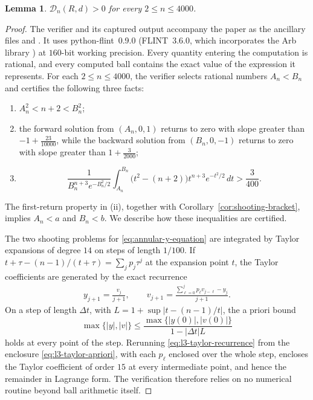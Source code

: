 \documentclass[11pt]{article}
\numberwithin{equation}{section}
\newtheorem{lemma}[theorem]{Lemma}
\theoremstyle{definition}
\begin{document}
\begin{lemma}\label{lem:l3-finite}
$\mathcal D_n(R,d)>0$ for every $2\leq n\leq4000$.
\end{lemma}

\begin{proof}
The verifier and its captured output accompany the paper as the ancillary
files  and
. It uses python-flint~0.9.0
(FLINT~3.6.0, which incorporates the Arb library \cite{arb}) at $160$-bit
working precision. Every quantity entering the computation is rational, and every computed ball contains
the exact value of the expression it represents. For each
$2\leq n\leq4000$, the verifier selects rational numbers
$A_n<B_n$ and certifies the following three facts:
\begin{enumerate}[label=\textup{(\roman*)}]
    \item $A_n^2<n+2<B_n^2$;
    \item the forward solution from $(A_n,0,1)$ returns to zero with slope
    greater than $-1+\frac{23}{10000}$, while the backward solution from
    $(B_n,0,-1)$ returns to zero with slope greater than
    $1+\frac{3}{2000}$;
    \item
    \[
        \frac{1}{B_n^{n+3}e^{-B_n^2/2}}
        \int_{A_n}^{B_n}\bigl(t^2-(n+2)\bigr)
        t^{n+3}e^{-t^2/2}\,dt>\frac3{400}.
    \]
\end{enumerate}
The first-return property in (ii), together with
Corollary~\ref{cor:shooting-bracket}, implies $A_n<a$ and $B_n<b$.
We describe how these inequalities are certified.

The two shooting problems for \eqref{eq:annular-y-equation} are integrated
by Taylor expansions of degree $14$ on steps of length $1/100$. If
$t+\tau-(n-1)/(t+\tau)=\sum_jp_j\tau^j$ at the expansion point $t$, the Taylor coefficients
are generated by the exact recurrence
\begin{equation}\label{eq:l3-taylor-recurrence}
\begin{aligned}
    y_{j+1}=\frac{v_j}{j+1},
    \qquad
    v_{j+1}=\frac{\sum_{\ell=0}^jp_\ell v_{j-\ell}-y_j}{j+1}.
\end{aligned}
\end{equation}
On a step of length $\Delta t$, with $L=1+\sup|t-(n-1)/t|$, the a priori bound
\begin{equation}\label{eq:l3-taylor-apriori}
    \max\{|y|,|v|\}
    \leq
    \frac{\max\{|y(0)|,|v(0)|\}}{1-|\Delta t|L}
\end{equation}
holds at every point of the step. Rerunning \eqref{eq:l3-taylor-recurrence}
from the enclosure \eqref{eq:l3-taylor-apriori}, with each $p_\ell$ enclosed
over the whole step, encloses the Taylor coefficient of order $15$ at every
intermediate point, and hence the remainder in Lagrange form. The verification
therefore relies on no numerical routine beyond ball arithmetic itself.


\end{proof}
\end{document}
